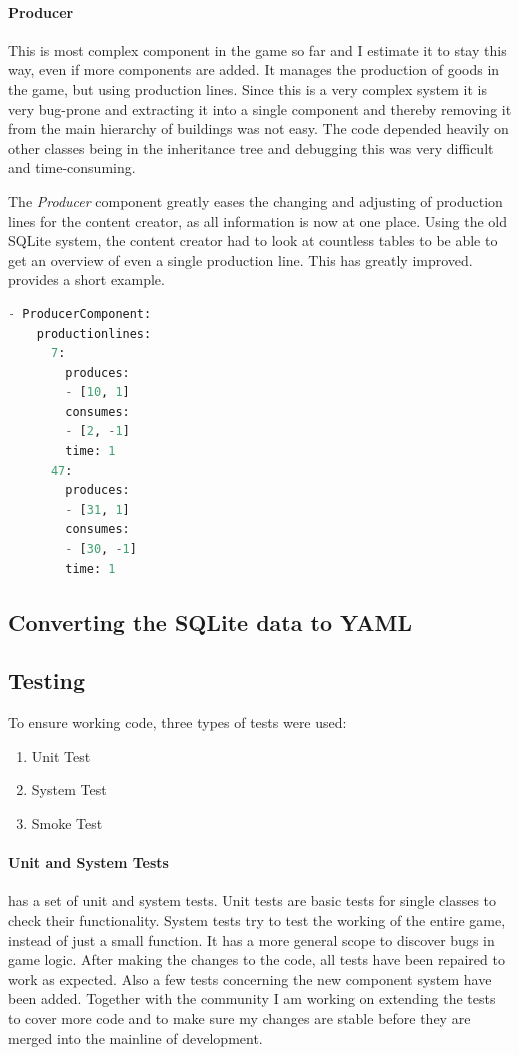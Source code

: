 \paragraph{Producer}
This is most complex component in the game so far and I estimate it to stay this way, even if more components are added.
It manages the production of goods in the game, but using production lines. Since this is a very complex system it is
very bug-prone and extracting it into a single component and thereby removing it from the main hierarchy of buildings
was not easy. The code depended heavily on other classes being in the inheritance tree and debugging this was very
difficult and time-consuming.

The \textit{Producer} component greatly eases the changing and adjusting of production lines for the content creator, as
all information is now at one place. Using the old SQLite system, the content creator had to look at countless tables to
be able to get an overview of even a single production line. This has greatly improved.  provides a short
example.

\begin{lstlisting}[language=python,caption=YAML representation of the Producer with two production lines,
label=produceryaml]
- ProducerComponent:
    productionlines:
      7:
        produces:
        - [10, 1]
        consumes:
        - [2, -1]
        time: 1
      47:
        produces:
        - [31, 1]
        consumes:
        - [30, -1]
        time: 1
\end{lstlisting}

\subsection{Converting the SQLite data to YAML}

\subsection{Testing}
To ensure working code, three types of tests were used:
\begin{enumerate}
    \item Unit Test
    \item System Test
    \item Smoke Test
\end{enumerate}

\paragraph{Unit and System Tests}
\UH{} has a set of unit and system tests. Unit tests are basic tests for single classes to check their functionality.
System tests try to test the working of the entire game, instead of just a small function. It has a more general scope
to discover bugs in game logic.
After making the changes to the code, all tests have been repaired to work as expected. Also a few tests concerning the
new component system have been added. Together with the community I am working on extending the tests to cover more code
and to make sure my changes are stable before they are merged into the mainline of development.

